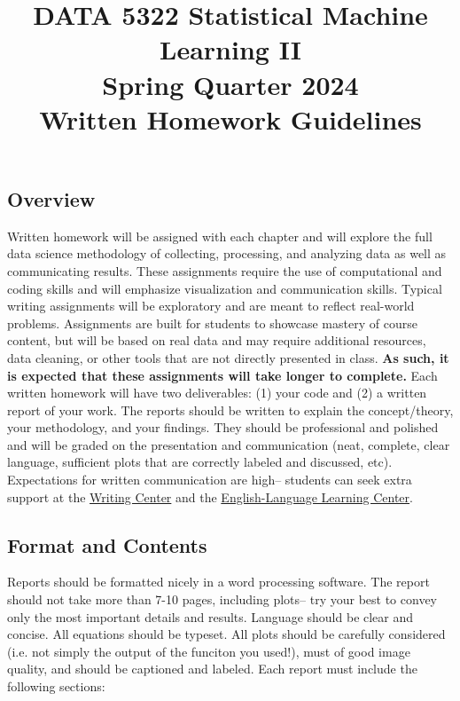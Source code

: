 \documentclass[16pt]{article}
\date{}
\title{\vspace{-1.5cm}DATA 5322 Statistical Machine Learning II \\ Spring Quarter 2024 \\ Written Homework Guidelines}
\begin{document}
	\maketitle
	
	
	
	\subsection*{Overview} Written homework will be assigned with each chapter and will explore the full data science methodology of collecting, processing, and analyzing data as well as communicating results.
	These assignments require the use of computational and coding skills and will emphasize visualization and communication skills. Typical writing assignments will be exploratory and are meant to reflect real-world problems. Assignments are built for students to showcase mastery of course content, but will be based on real data and may require additional resources, data cleaning, or other tools that are not directly presented in class.\textbf{ As such, it is expected that these assignments will take longer to complete.} Each written homework will have two deliverables: (1) your code and (2) a written report of your work. The reports should be written to explain the concept/theory, your methodology, and your findings. They should be professional and polished and will be graded on the presentation and communication (neat, complete, clear language, sufficient plots that are correctly labeled and discussed, etc). Expectations for written communication are high-- students can seek extra support at the \href{https://www.seattleu.edu/writingcenter/}{Writing Center} and the \href{https://www.seattleu.edu/ellc/ellc-tutoring/}{English-Language Learning Center}.
	
	\subsection*{Format and Contents}
	
	Reports should be formatted nicely in a word processing software. The report should not take more than 7-10 pages, including plots-- try your best to convey only the most important details and results. Language should be clear and concise. All equations should be typeset. All plots should be carefully considered (i.e. not simply the output of the funciton you used!), must of good image quality, and should be captioned and labeled. Each report must include the following sections:
	
\end{document}
